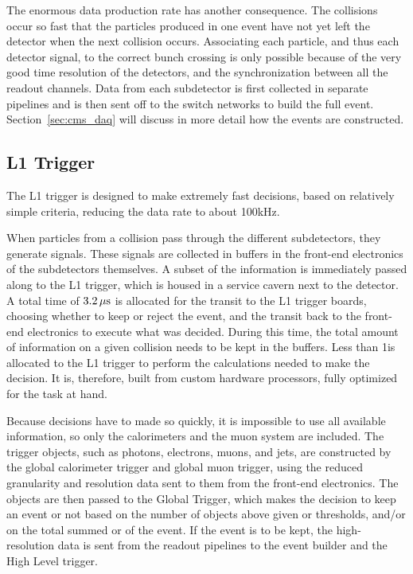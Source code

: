 The enormous data production rate has another consequence. The collisions occur so fast that the
particles produced in one event have not yet left the detector when the next collision occurs. 
Associating each particle, and thus each detector signal, to the correct bunch crossing is only
possible because of the very good time resolution of the detectors, and the synchronization between
all the readout channels. 
Data from each subdetector is first collected in separate pipelines and is then sent off to the
switch networks to build the full event. Section~\ref{sec:cms_daq} will discuss in more detail how
the events are constructed.

\subsection{L1 Trigger \label{sec:cms_level_one}}

The L1 trigger is designed to make extremely fast decisions, based on relatively simple criteria,
reducing the data rate to about 100\unit{kHz}. 

When particles from a collision pass through the different subdetectors, they generate signals.
These signals are collected in buffers in the front-end electronics of the subdetectors themselves. 
A subset of the information is immediately passed along to the L1 trigger, which is housed
in a service cavern next to the detector. A total time of $3.2\,\mu\text{s}$ is allocated for the transit to
the L1 trigger boards, choosing whether to keep or reject the event, and the transit back to the
front-end electronics to execute what was decided. During this time, the total amount of information
on a given collision needs to be kept in the buffers.
Less than 1\mus is allocated to the L1 trigger to perform the calculations needed to make the
decision. It is, therefore, built from custom hardware processors, fully optimized for the task at
hand. 

Because decisions have to made so quickly, it is impossible to use all available information, so
 only the calorimeters and the muon system are included. 
The trigger objects, such as photons, electrons, muons, and jets, are constructed by the global
calorimeter trigger and global muon trigger, using the reduced granularity and resolution data
sent to them from the front-end electronics. The objects are then passed to the Global Trigger,
which makes the decision to keep an event or not based on the number of objects above given \ET
or \pt thresholds, and/or on the total summed \ET or \ETm of the event. If the event is to be kept,
the high-resolution data is sent from the readout pipelines to the event builder and the High
Level trigger. 


